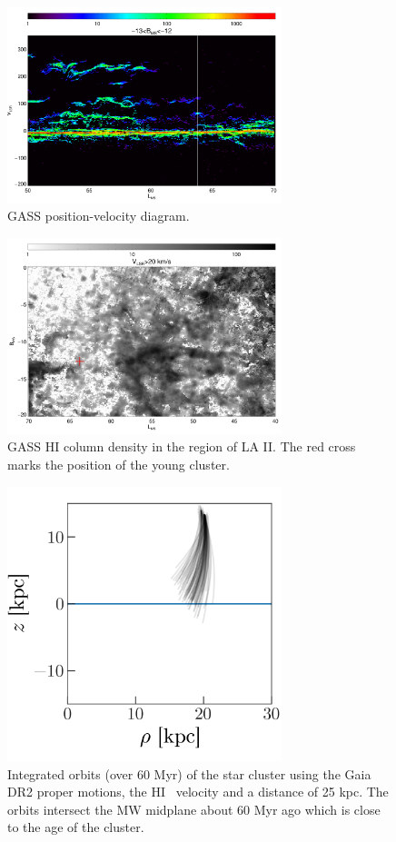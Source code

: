 \documentclass[modern]{aastex62}
\newcommand{\hi}{H{\footnotesize I} }
\begin{document}
\begin{figure}
\centering
\includegraphics[width=8cm]{gass_vlsrmlon.pdf}
\caption{GASS position-velocity diagram.}
\label{fig_gass}
\end{figure}

\begin{figure}
\centering
\includegraphics[width=8cm]{gass_mlatmlon.pdf}
\caption{GASS \hi column density in the region of LA II. The red cross marks the position
of the young cluster.}
\label{fig_gass}
\end{figure}

\begin{figure}
\centering
\includegraphics[width=8cm]{orbits.png}
\caption{Integrated orbits (over 60 Myr) of the star cluster using the Gaia DR2 proper motions, the
\hi~velocity and a distance of 25 kpc.  The orbits intersect the MW midplane about
60 Myr ago which is close to the age of the cluster.}
\label{fig_gass}
\end{figure}
\end{document}
